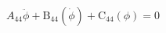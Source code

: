 \begin{equation} \label{eq:roll_decay_equation_general_himeno}
A_{44} \ddot{\phi} + \operatorname{B_{44}}\left(\dot{\phi}\right) + \operatorname{C_{44}}\left(\phi\right) = 0
\end{equation}
